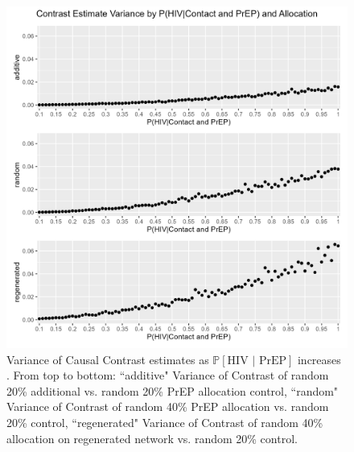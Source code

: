 \documentclass{article}
\theoremstyle{definition}
\begin{document}
\begin{figure}[H]
    \centering
    \includegraphics[scale=0.75]{Figures/p2 Variance plots.png}
    \caption{Variance of Causal Contrast estimates as $\mathbb{P}\left[\text{HIV } \vert \text{ PrEP}\right]$ increases .  From top to bottom: ``additive" Variance of Contrast of random 20\% additional vs. random 20\% PrEP allocation control, ``random" Variance of Contrast of random 40\% PrEP allocation vs. random 20\% control, ``regenerated" Variance of Contrast of random 40\% allocation on regenerated network vs. random 20\% control.}
    \label{fig:Figure 16}
\end{figure}
\end{document}

